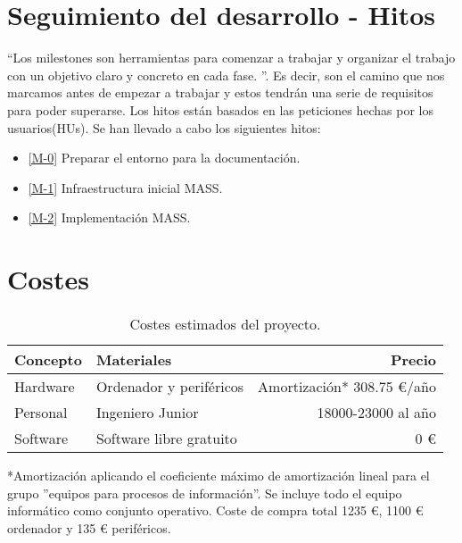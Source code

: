 \section{Seguimiento del desarrollo - Hitos}
``Los milestones son herramientas para comenzar a trabajar y organizar el trabajo con un objetivo claro y concreto en cada fase.
''\cite{iv}. Es decir, son el camino que nos marcamos antes de empezar a trabajar y estos tendrán una serie de requisitos para poder superarse. Los hitos están basados en las peticiones hechas por los usuarios(HUs). Se han llevado a cabo los siguientes hitos:
\begin{itemize}
    \item \href{https://github.com/marcosrmartin/MTD_Server/milestone/1}{[M-0]} Preparar el entorno para la documentación.
    \item \href{https://github.com/marcosrmartin/MTD_Server/milestone/3}{[M-1]} Infraestructura inicial MASS.
    \item \href{https://github.com/marcosrmartin/MTD_Server/milestone/2}{[M-2]} Implementación MASS.
\end{itemize}


\section{Costes}
\begin{table}[H]
	\centering
	\begin{tabular}{| l | l | r |}
        \hline
        \textbf{Concepto} & \textbf{Materiales} & \textbf{Precio} \\
        \hline
        Hardware	& Ordenador y periféricos & Amortización* 308.75 €/año\\
        Personal 	& Ingeniero Junior	& 18000-23000 al año \\
        Software 	& Software libre gratuito & 0 € \\
        \hline
        \hline
	\end{tabular}
	\caption{Costes estimados del proyecto.}
\end{table}

*Amortización aplicando el coeficiente máximo de amortización lineal para el grupo ''equipos para procesos de información''\cite{amortizacion}. Se incluye todo el equipo informático como conjunto operativo. Coste de compra total 1235 €, 1100 € ordenador y 135 € periféricos.